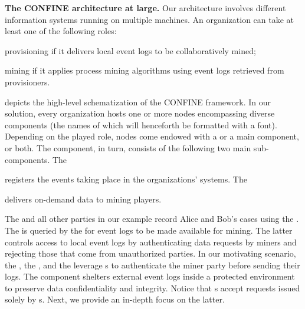 \noindent\textbf{The CONFINE architecture at large.}
Our architecture involves different information systems running on multiple machines. An organization can take at least one of the following roles: 
\begin{inparadesc}
\item[provisioning] if it delivers local event logs to be collaboratively mined;
\item[mining] if it applies process mining algorithms using event logs retrieved from provisioners.
\end{inparadesc}
 depicts the high-level schematization of the CONFINE framework.
In our solution, every organization hosts one or more nodes encompassing diverse components (the names of which will henceforth be formatted with a  font). Depending on the played role, nodes come endowed with a  or a  main component, or both. The  component, in turn, consists of the following two main sub-components. The \begin{inparadesc}
\item[\Compo{Log Recorder}] registers the events taking place in the organizations' systems. The
\item[\Compo{Log Provider}] delivers on-demand data to mining players.
\end{inparadesc}
The  and all other parties in our example record Alice and Bob's cases using the . The  is queried by the  for event logs to be made available for mining. The latter controls access to local event logs by authenticating data requests by miners and rejecting those that come from unauthorized parties.
In our motivating scenario, the , the , and the  leverage s to authenticate the miner party before sending their logs.  The  component
shelters external event logs inside a protected environment to preserve data confidentiality and integrity.
Notice that s accept requests issued solely by s. 
Next, we provide an in-depth focus on the latter.

